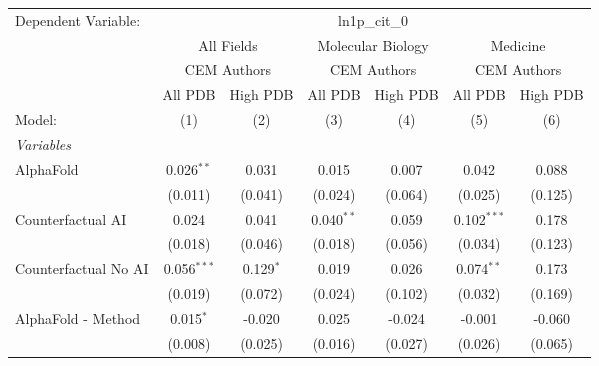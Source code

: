 \begingroup
\centering
\begin{tabular}{lcccccc}
   \tabularnewline \midrule \midrule
   Dependent Variable: & \multicolumn{6}{c}{ln1p\_cit\_0}\\
 & \multicolumn{2}{c}{All Fields} & \multicolumn{2}{c}{Molecular Biology} & \multicolumn{2}{c}{Medicine} \\
\cmidrule(lr){2-3} \cmidrule(lr){4-5} \cmidrule(lr){6-7}
 & \multicolumn{2}{c}{CEM Authors} & \multicolumn{2}{c}{CEM Authors} & \multicolumn{2}{c}{CEM Authors} \\
\cmidrule(lr){2-3} \cmidrule(lr){4-5} \cmidrule(lr){6-7}
 & \multicolumn{1}{c}{All PDB} & \multicolumn{1}{c}{High PDB} & \multicolumn{1}{c}{All PDB} & \multicolumn{1}{c}{High PDB} & \multicolumn{1}{c}{All PDB} & \multicolumn{1}{c}{High PDB} \\
\cmidrule(lr){2-2} \cmidrule(lr){3-3} \cmidrule(lr){4-4} \cmidrule(lr){5-5} \cmidrule(lr){6-6} \cmidrule(lr){7-7}
   Model:                                                     & (1)            & (2)         & (3)          & (4)     & (5)           & (6)\\  
   \midrule
   \emph{Variables}\\
   AlphaFold                                                  & 0.026$^{**}$   & 0.031       & 0.015        & 0.007   & 0.042         & 0.088\\   
                                                              & (0.011)        & (0.041)     & (0.024)      & (0.064) & (0.025)       & (0.125)\\   
   Counterfactual AI                                          & 0.024          & 0.041       & 0.040$^{**}$ & 0.059   & 0.102$^{***}$ & 0.178\\   
                                                              & (0.018)        & (0.046)     & (0.018)      & (0.056) & (0.034)       & (0.123)\\   
   Counterfactual No AI                                       & 0.056$^{***}$  & 0.129$^{*}$ & 0.019        & 0.026   & 0.074$^{**}$  & 0.173\\   
                                                              & (0.019)        & (0.072)     & (0.024)      & (0.102) & (0.032)       & (0.169)\\   
   AlphaFold - Method                                         & 0.015$^{*}$    & -0.020      & 0.025        & -0.024  & -0.001        & -0.060\\   
                                                              & (0.008)        & (0.025)     & (0.016)      & (0.027) & (0.026)       & (0.065)\\   

\end{tabular}
